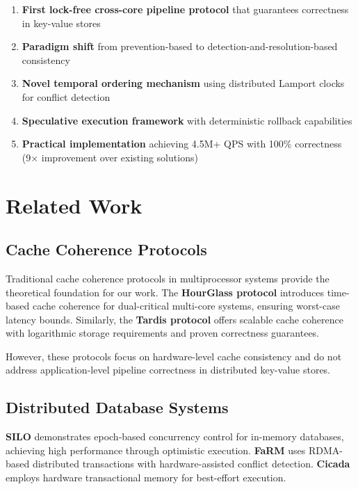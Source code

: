 \documentclass[conference]{IEEEtran}
\begin{document}
\begin{enumerate}
\item \textbf{First lock-free cross-core pipeline protocol} that guarantees correctness in key-value stores
\item \textbf{Paradigm shift} from prevention-based to detection-and-resolution-based consistency
\item \textbf{Novel temporal ordering mechanism} using distributed Lamport clocks for conflict detection
\item \textbf{Speculative execution framework} with deterministic rollback capabilities
\item \textbf{Practical implementation} achieving 4.5M+ QPS with 100\% correctness (9× improvement over existing solutions)
\end{enumerate}

\section{Related Work}

\subsection{Cache Coherence Protocols}

Traditional cache coherence protocols in multiprocessor systems provide the theoretical foundation for our work. The \textbf{HourGlass protocol} \cite{hassan2017hourglass} introduces time-based cache coherence for dual-critical multi-core systems, ensuring worst-case latency bounds. Similarly, the \textbf{Tardis protocol} \cite{kogan2015tardis} offers scalable cache coherence with logarithmic storage requirements and proven correctness guarantees.

However, these protocols focus on hardware-level cache consistency and do not address application-level pipeline correctness in distributed key-value stores.

\subsection{Distributed Database Systems}

\textbf{SILO} \cite{tu2013silo} demonstrates epoch-based concurrency control for in-memory databases, achieving high performance through optimistic execution. \textbf{FaRM} \cite{dragojevic2014farm} uses RDMA-based distributed transactions with hardware-assisted conflict detection. \textbf{Cicada} \cite{lim2017cicada} employs hardware transactional memory for best-effort execution.
\end{document}
